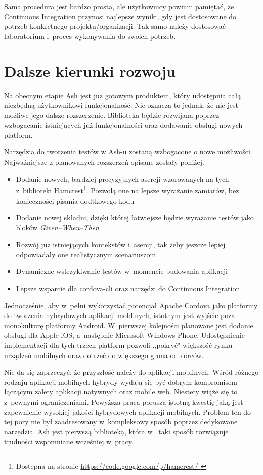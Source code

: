 \documentclass[brudnopis]{xmgr}
\begin{document}
Sama procedura jest bardzo prosta, ale użytkownicy powinni pamiętać, że Continuous Integration przynosi najlepsze wyniki, gdy jest dostosowane do potrzeb konkretnego projektu/organizacji. Tak samo należy dostosować laboratorium i~proces wykonywania do swoich potrzeb. 

\chapter{Dalsze kierunki rozwoju}

Na obecnym etapie Ash jest już gotowym produktem, który udostępnia całą niezbędną użytkownikowi funkcjonalność. Nie oznacza to jednak, że nie jest możliwe jego dalsze rozszerzenie. Biblioteka będzie rozwijana poprzez wzbogacanie istniejących już funkcjonalności oraz dodawanie obsługi nowych platform. 

Narzędzia do tworzenia testów w Ash-u zostaną wzbogacone o nowe możliwości. Najważniejsze z planowanych rozszerzeń opisane zostały poniżej.

\begin{itemize}
  \item Dodanie nowych, bardziej precyzyjnych asercji wzorowanych na tych z~biblioteki Hamcrest\footnote{Dostępna na stronie \url{https://code.google.com/p/hamcrest/ } }. Pozwolą one na lepsze wyrażanie zamiarów, bez konieczności pisania dodtkowego kodu
  \item Dodanie nowej składni, dzięki której łatwiejsze będzie wyrażanie testów jako bloków \textit{Given--When--Then}
  \item Rozwój już istniejących kontekstów i~asercji, tak żeby jeszcze lepiej odpowiadały one realistycznym scenariuszom 
  \item Dynamiczne wstrzykiwanie testów w~momencie budowania aplikacji
  \item Lepsze wsparcie dla cordova-cli oraz narzędzi do Continuous Integration
\end{itemize}

Jednocześnie, aby w~pełni wykorzystać potencjał Apache Cordova jako platformy do tworzenia hybrydowych aplikacji moblinych, istotnym jest wyjście poza monokulturę platformy Android. W~pierwszej kolejności planowane jest dodanie obsługi dla Apple iOS, a~następnie Microsoft Windows Phone.  Udostępnienie implementacji dla tych trzech platform pozwoli ,,pokryć" większość rynku urządzeń mobilnych oraz dotrzeć do większego grona odbiorców. 

\summary

Nie da się zaprzeczyć, że przyszłość należy do aplikacji moblinych. Wśród różnego rodzaju aplikacji mobilnych hybrydy wydają się być dobrym kompromisem łączącym zalety aplikacji natywnych oraz mobile web. Niestety wiąże się to z~pewnymi ograniczeniami. Powyższa praca porusza istotną kwestię jaką jest zapewnienie wysokiej jakości hybrydowych aplikacji mobilnych. Problem ten do tej pory nie był zaadresowany w~kompleksowy sposób poprzez dedykowane narzędzia. Ash jest pierwszą biblioteką, która w~ taki sposób rozwiązuje trudności wspomniane wcześniej w~pracy.
\end{document}
